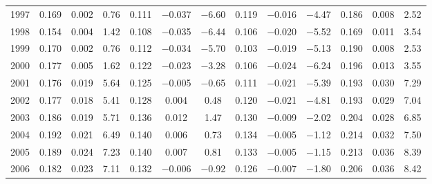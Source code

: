 {\begin{tabular}{l*{4}{ccc}}
1997        &       0.169&       0.002&        0.76&       0.111&    $-$0.037&     $-$6.60&       0.119&    $-$0.016&     $-$4.47&       0.186&       0.008&        2.52\\
1998        &       0.154&       0.004&        1.42&       0.108&    $-$0.035&     $-$6.44&       0.106&    $-$0.020&     $-$5.52&       0.169&       0.011&        3.54\\
1999        &       0.170&       0.002&        0.76&       0.112&    $-$0.034&     $-$5.70&       0.103&    $-$0.019&     $-$5.13&       0.190&       0.008&        2.53\\
2000        &       0.177&       0.005&        1.62&       0.122&    $-$0.023&     $-$3.28&       0.106&    $-$0.024&     $-$6.24&       0.196&       0.013&        3.55\\
2001        &       0.176&       0.019&        5.64&       0.125&    $-$0.005&     $-$0.65&       0.111&    $-$0.021&     $-$5.39&       0.193&       0.030&        7.29\\
2002        &       0.177&       0.018&        5.41&       0.128&       0.004&        0.48&       0.120&    $-$0.021&     $-$4.81&       0.193&       0.029&        7.04\\
2003        &       0.186&       0.019&        5.71&       0.136&       0.012&        1.47&       0.130&    $-$0.009&     $-$2.02&       0.204&       0.028&        6.85\\
2004        &       0.192&       0.021&        6.49&       0.140&       0.006&        0.73&       0.134&    $-$0.005&     $-$1.12&       0.214&       0.032&        7.50\\
2005        &       0.189&       0.024&        7.23&       0.140&       0.007&        0.81&       0.133&    $-$0.005&     $-$1.15&       0.213&       0.036&        8.39\\
2006        &       0.182&       0.023&        7.11&       0.132&    $-$0.006&     $-$0.92&       0.126&    $-$0.007&     $-$1.80&       0.206&       0.036&        8.42\\
\bottomrule
\end{tabular}
}
